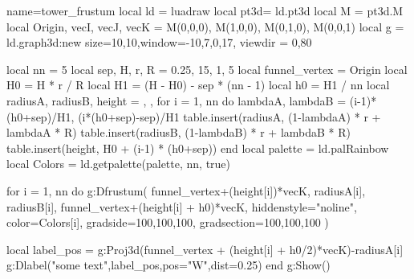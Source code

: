 \documentclass{standalone}
\begin{document}
\begin{luadraw}{name=tower_frustum}
    local ld = luadraw
    local pt3d= ld.pt3d
    local M = pt3d.M
    local Origin, vecI, vecJ, vecK = M(0,0,0), M(1,0,0), M(0,1,0), M(0,0,1)
    local g = ld.graph3d:new{ size={10,10},window={-10,7,0,17}, viewdir = {0,80} }

    local nn = 5
    local sep, H, r, R = 0.25, 15, 1, 5
    local funnel_vertex = Origin
    local H0 = H * r / R
    local H1 = (H - H0) - sep * (nn - 1)
    local h0 = H1 / nn
    local radiusA, radiusB, height = {}, {}, {}
    for i = 1, nn do
        lambdaA, lambdaB = (i-1)*(h0+sep)/H1, (i*(h0+sep)-sep)/H1
        table.insert(radiusA, (1-lambdaA) * r + lambdaA * R)
        table.insert(radiusB, (1-lambdaB) * r + lambdaB * R)
        table.insert(height, H0 + (i-1) * (h0+sep))
    end
    local palette = ld.palRainbow
    local Colors = ld.getpalette(palette, nn, true)

    for i = 1, nn do
        g:Dfrustum(
            funnel_vertex+(height[i])*vecK, 
            radiusA[i], 
            radiusB[i], 
            funnel_vertex+(height[i] + h0)*vecK,
            {
                hiddenstyle="noline", 
                color=Colors[i],
                gradside={100,100,100}, 
                gradsection={100,100,100}
            }
        )

        local label_pos = g:Proj3d(funnel_vertex + (height[i] + h0/2)*vecK)-radiusA[i]
        g:Dlabel("some text",label_pos,{pos="W",dist=0.25})
    end
    g:Show()
\end{luadraw}
\end{document}
